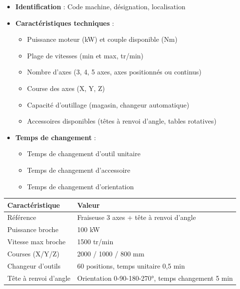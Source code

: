 \documentclass{article}
\begin{document}
\begin{itemize}
    \item \textbf{Identification} : Code machine, désignation, localisation
    \item \textbf{Caractéristiques techniques} : 
    \begin{itemize}
        \item Puissance moteur (kW) et couple disponible (Nm)
        \item Plage de vitesses (min et max, tr/min)
        \item Nombre d'axes (3, 4, 5 axes, axes positionnés ou continus)
        \item Course des axes (X, Y, Z)
        \item Capacité d'outillage (magasin, changeur automatique)
        \item Accessoires disponibles (têtes à renvoi d'angle, tables rotatives)
    \end{itemize}
    \item \textbf{Temps de changement} : 
    \begin{itemize}
        \item Temps de changement d'outil unitaire
        \item Temps de changement d'accessoire
        \item Temps de changement d'orientation
    \end{itemize}
\end{itemize}

\begin{tcolorbox}[colback=blue!5!white, colframe=blue!75!black, title=Exemple : Fiche machine pour atelier d'usinage]
\begin{tabular}{|p{}|p{}|}
\hline
\textbf{Caractéristique} & \textbf{Valeur} \\
\hline
Référence & Fraiseuse 3 axes + tête à renvoi d'angle \\
\hline
Puissance broche & 100 kW \\
\hline
Vitesse max broche & 1500 tr/min \\
\hline
Courses (X/Y/Z) & 2000 / 1000 / 800 mm \\
\hline
Changeur d'outils & 60 positions, temps unitaire 0,5 min \\
\hline
Tête à renvoi d'angle & Orientation 0-90-180-270°, temps changement 5 min \\
\hline
\end{tabular}
\end{tcolorbox}
\end{document}
